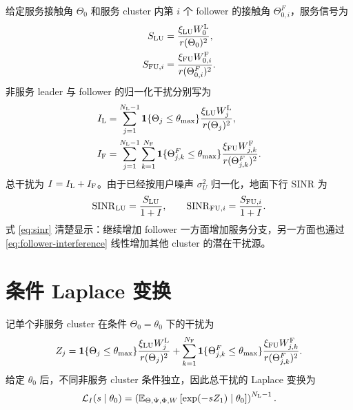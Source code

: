 \documentclass[UTF8,a4paper,11pt]{ctexart}
\newcommand{\thetam}{\theta_{\max}}
\newcommand{\NL}{N_{\rm L}}
\newcommand{\NF}{N_{\rm F}}
\newcommand{\E}{\mathbb{E}}
\newcommand{\SINR}{\operatorname{SINR}}
\newcommand{\IL}{I_{\rm L}}
\newcommand{\IF}{I_{\rm F}}
\newcommand{\IT}{I}
\newcommand{\Lcal}{\mathcal{L}}
\begin{document}
给定服务接触角 $\Theta_0$ 和服务 cluster 内第 $i$ 个 follower 的接触角
$\Theta^F_{0,i}$，服务信号为
\begin{align}
    S_{\rm LU}
    &=
    \frac{\xi_{\rm LU} W_{0}^{\rm L}}{r(\Theta_0)^2},\\
    S_{{\rm FU},i}
    &=
    \frac{\xi_{\rm FU} W_{0,i}^{\rm F}}{r(\Theta^F_{0,i})^2}.
\end{align}
非服务 leader 与 follower 的归一化干扰分别写为
\begin{align}
    \IL
    &=
    \sum_{j=1}^{\NL-1}
    \mathbf{1}\{\Theta_j\leq\thetam\}
    \frac{\xi_{\rm LU} W_{j}^{\rm L}}{r(\Theta_j)^2},
    \label{eq:leader-interference}\\
    \IF
    &=
    \sum_{j=1}^{\NL-1}\sum_{k=1}^{\NF}
    \mathbf{1}\{\Theta^F_{j,k}\leq\thetam\}
    \frac{\xi_{\rm FU} W_{j,k}^{\rm F}}{r(\Theta^F_{j,k})^2}.
    \label{eq:follower-interference}
\end{align}
总干扰为 $\IT=\IL+\IF$。由于已经按用户噪声 $\sigma_U^2$ 归一化，地面下行 SINR 为
\begin{equation}
    \SINR_{\rm LU}
    =
    \frac{S_{\rm LU}}{1+\IT},
    \qquad
    \SINR_{{\rm FU},i}
    =
    \frac{S_{{\rm FU},i}}{1+\IT}.
    \label{eq:sinr}
\end{equation}
式 \eqref{eq:sinr} 清楚显示：继续增加 follower 一方面增加服务分支，另一方面也通过
\eqref{eq:follower-interference} 线性增加其他 cluster 的潜在干扰源。

\section{条件 Laplace 变换}

记单个非服务 cluster 在条件 $\Theta_0=\theta_0$ 下的干扰为
\begin{equation}
    Z_j
    =
    \mathbf{1}\{\Theta_j\leq\thetam\}
    \frac{\xi_{\rm LU} W_{j}^{\rm L}}{r(\Theta_j)^2}
    +
    \sum_{k=1}^{\NF}
    \mathbf{1}\{\Theta^F_{j,k}\leq\thetam\}
    \frac{\xi_{\rm FU} W_{j,k}^{\rm F}}{r(\Theta^F_{j,k})^2}.
\end{equation}
给定 $\theta_0$ 后，不同非服务 cluster 条件独立，因此总干扰的 Laplace 变换为
\begin{equation}
    \Lcal_{\IT}(s\mid\theta_0)
    =
    \left(
    \E_{\Theta,\Psi,\Phi,W}
    \left[\exp(-s Z_1)\mid\theta_0\right]
    \right)^{\NL-1}.
    \label{eq:laplace-product}
\end{equation}
\end{document}
